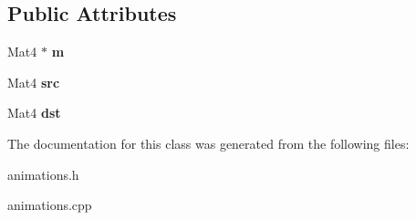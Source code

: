 \subsection*{Public Attributes}
\begin{DoxyCompactItemize}
\item 
\hypertarget{classg2c_1_1_move_matrix_a0094dfbb7dbfcb12775b4316b64a9c7a}{
Mat4 $\ast$ {\bfseries m}}
\label{classg2c_1_1_move_matrix_a0094dfbb7dbfcb12775b4316b64a9c7a}

\item 
\hypertarget{classg2c_1_1_move_matrix_ae83d9ef3e4a581580693afb965a0d5c7}{
Mat4 {\bfseries src}}
\label{classg2c_1_1_move_matrix_ae83d9ef3e4a581580693afb965a0d5c7}

\item 
\hypertarget{classg2c_1_1_move_matrix_a7b85bd72745ee41a1e41163d795355be}{
Mat4 {\bfseries dst}}
\label{classg2c_1_1_move_matrix_a7b85bd72745ee41a1e41163d795355be}

\end{DoxyCompactItemize}


The documentation for this class was generated from the following files:\begin{DoxyCompactItemize}
\item 
animations.h\item 
animations.cpp\end{DoxyCompactItemize}
